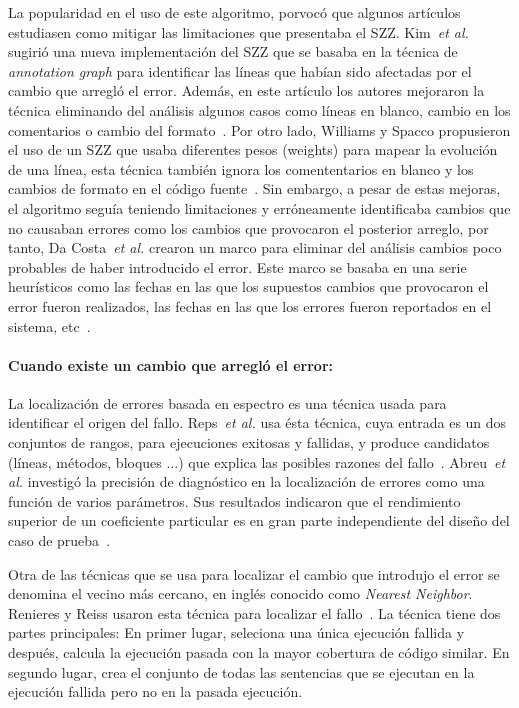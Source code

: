 \documentclass[a4paper, 12pt]{book}
\begin{document}
La popularidad en el uso de este algoritmo, porvoc\'o que algunos art\'iculos estudiasen como mitigar las limitaciones que presentaba el SZZ. Kim~\textit{et al.} sugiri\'o una nueva implementaci\'on del SZZ que se basaba en la t\'ecnica de \textit{annotation graph} para identificar las l\'ineas que hab\'ian sido afectadas por el cambio que arregl\'o el error. Adem\'as, en este art\'iculo los autores mejoraron la t\'ecnica eliminando del an\'alisis algunos casos como l\'ineas en blanco, cambio en los comentarios o cambio del formato~\cite{kim2006automatic}. Por otro lado, Williams y Spacco propusieron el uso de un SZZ que usaba diferentes pesos (weights) para mapear la evoluci\'on de una l\'inea, esta t\'ecnica tambi\'en ignora los comententarios en blanco y los cambios de formato en el c\'odigo fuente~\cite{williams2008szz}. Sin embargo, a pesar de estas mejoras, el algoritmo segu\'ia teniendo limitaciones y err\'oneamente identificaba cambios que no causaban errores como los cambios que provocaron el posterior arreglo, por tanto,  Da Costa~\textit{et al.} crearon un marco para eliminar del an\'alisis cambios poco probables de haber introducido el error. Este marco se basaba en una serie heur\'isticos como las fechas en las que los supuestos cambios que provocaron el error fueron realizados, las fechas en las que los errores fueron reportados en el sistema, etc~\cite{da2016framework}.

\paragraph{Cuando existe un cambio que arregl\'o el error:}
La localizaci\'on de errores basada en espectro es una t\'ecnica usada para identificar el origen del fallo. Reps~\textit{et al.} usa \'esta t\'ecnica, cuya entrada es un dos conjuntos de rangos, para ejecuciones exitosas y fallidas, y produce candidatos (l\'ineas, m\'etodos, bloques ...) que explica las posibles razones del fallo~\cite{reps}. Abreu~\textit{et al.} investig\'o la precisi\'on de diagn\'ostico en la localizaci\'on de errores como una funci\'on de varios par\'ametros. Sus resultados indicaron que el rendimiento superior de un coeficiente particular es en gran parte independiente del dise\~no del caso de prueba~\cite{abreu2007accuracy}.

Otra de las t\'ecnicas que se usa para localizar el cambio que introdujo el error se denomina el vecino m\'as cercano, en ingl\'es conocido como \emph{Nearest Neighbor}. Renieres y Reiss usaron esta t\'ecnica para localizar el fallo~\cite{renieres2003fault}. La t\'ecnica tiene dos partes principales: En primer lugar, seleciona una \'unica ejecuci\'on fallida y despu\'es, calcula la ejecuci\'on pasada con la mayor cobertura de c\'odigo similar. En segundo lugar, crea el conjunto de todas las sentencias que se ejecutan en la ejecuci\'on fallida pero no en la pasada ejecuci\'on.
\end{document}
